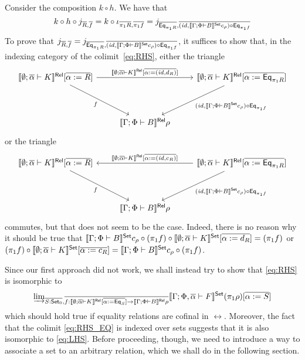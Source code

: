 \documentclass{lmcs}
\theoremstyle{plain}\newtheorem{satz}[thm]{Satz}
\newcommand{\set}{\mathsf{Set}}
\renewcommand{\id}{\mathit{id}}
\begin{document}
Consider the composition $k \circ h$.
We have that
\[
k \circ h \circ j_{\ol{R}, \ol{f}}
= k \circ \iota_{\ol{\pi_1 R}, \ol{\pi_1 f}}
= j_{\ol{\Eq_{\pi_1 R}}, \ol{(\id, \setsem{\Gamma; \Phi \vdash B} c_\rho) \circ \Eq_{\pi_1 f}}}
\]
To prove that $j_{\ol{R}, \ol{f}} = j_{\ol{\Eq_{\pi_1 R}}, \ol{(\id, \setsem{\Gamma; \Phi \vdash B} c_\rho) \circ \Eq_{\pi_1 f}}}$,
it suffices to show that, in the indexing category of the colimit~\eqref{eq:RHS}, either the triangle
\[
\begin{tikzcd}[row sep = huge]
\relsem{\emptyset; \ol{\alpha} \vdash K}[\ol{\alpha := R}]
	\ar[rr, "{\relsem{\emptyset; \ol{\alpha} \vdash K}[\ol{\alpha := (\id, d_{R})}]}"]
	\ar[dr, "{f}"']
&& \relsem{\emptyset; \ol{\alpha} \vdash K}[\ol{\alpha := \Eq_{\pi_1 R}}]
	\ar[dl, "{(\id, \setsem{\Gamma; \Phi \vdash B} c_\rho) \circ \Eq_{\pi_1 f}}"] \\
&\relsem{\Gamma; \Phi \vdash B}\rho
\end{tikzcd}
\]
or the triangle
\[
\begin{tikzcd}[row sep = huge]
\relsem{\emptyset; \ol{\alpha} \vdash K}[\ol{\alpha := R}]
	\ar[dr, "{f}"']
&& \relsem{\emptyset; \ol{\alpha} \vdash K}[\ol{\alpha := \Eq_{\pi_1 R}}]
	\ar[dl, "{(\id, \setsem{\Gamma; \Phi \vdash B} c_\rho) \circ \Eq_{\pi_1 f}}"]
	\ar[ll, "{\relsem{\emptyset; \ol{\alpha} \vdash K}[\ol{\alpha := (\id, c_{R})}]}"'] \\
&\relsem{\Gamma; \Phi \vdash B}\rho
\end{tikzcd}
\]
commutes, but that does not seem to be the case.
Indeed, there is no reason why it should be true that $\setsem{\Gamma; \Phi \vdash B} c_\rho \circ (\pi_1 f) \circ \setsem{\emptyset; \ol{\alpha} \vdash K}[\ol{\alpha := d_{R}}] = (\pi_1 f)$
or $(\pi_1 f) \circ \setsem{\emptyset; \ol{\alpha} \vdash K}[\ol{\alpha := c_{R}}] = \setsem{\Gamma; \Phi \vdash B} c_\rho \circ (\pi_1 f)$.

Since our first approach did not work, we shall instead try to show that \eqref{eq:RHS} is isomorphic to
\begin{equation}\label{eq:RHS_EQ}
\colim{\ol{S : \set_0}, \ol{f : \relsem{\emptyset; \ol{\alpha} \vdash K}[\ol{\alpha := \Eq_S}] \to \relsem{\Gamma; \Phi \vdash B}\rho}}
{\setsem{\Gamma; \Phi, \ol{\alpha} \vdash F}(\pi_1 \rho)[\ol{\alpha := S}]}
\end{equation}
which should hold true if equality relations are cofinal in $\rel$.
Moreover, the fact that the colimit \eqref{eq:RHS_EQ} is indexed over sets suggests that it is also isomorphic to \eqref{eq:LHS}.
Before proceeding, though, we need to introduce a way to associate a set to an arbitrary relation, which we shall do in the following section.
\end{document}
